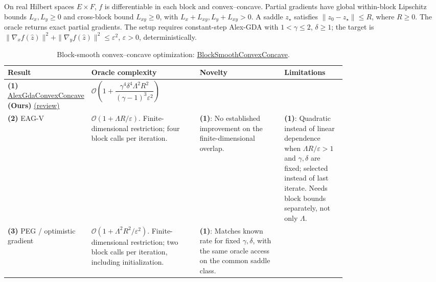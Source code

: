 \begin{table}[tp]
\centering
\caption{Block-smooth convex--concave optimization: \href{https://github.com/k3nfalt/longtails/blob/main/LongTails/Setups/BlockSmoothConvexConcave.lean}{BlockSmoothConvexConcave}.}\label{tab:BlockSmoothConvexConcave}
\parbox{\linewidth}{\footnotesize On real Hilbert spaces $E\times F$, $f$ is differentiable in each block and convex--concave. Partial gradients have global within-block Lipschitz bounds $L_x,L_y\ge0$ and cross-block bound $L_{xy}\ge0$, with $L_x+L_{xy},L_y+L_{xy}>0$. A saddle $z_\star$ satisfies $\|z_0-z_\star\|\le R$, where $R\ge0$. The oracle returns exact partial gradients. The setup requires constant-step Alex-GDA with $1<\gamma\le2$, $\delta\ge1$; the target is $\|\nabla_x f(\hat z)\|^2+\|\nabla_y f(\hat z)\|^2\le\varepsilon^2$, $\varepsilon>0$, deterministically.}\par\smallskip
\begin{threeparttable}
\footnotesize
\setlength{\tabcolsep}{4pt}\renewcommand{\arraystretch}{1.25}
\begin{tabularx}{\linewidth}{@{}>{\raggedright\arraybackslash}p{0.20\linewidth}>{\raggedright\arraybackslash}p{0.32\linewidth}>{\raggedright\arraybackslash}p{0.25\linewidth}>{\raggedright\arraybackslash}X@{}}
\toprule
\textbf{Result} & \textbf{Oracle complexity} & \textbf{Novelty} & \textbf{Limitations} \\
\midrule
\textbf{(1)} \href{https://github.com/k3nfalt/longtails/blob/main/LongTails/Theorems/AlexGdaConvexConcave.lean}{Alex\allowbreak Gda\allowbreak Convex\allowbreak Concave} \textbf{(Ours)} \href{https://github.com/k3nfalt/longtails/blob/main/scripts/reviews/AlexGdaConvexConcave.md}{(review)}
& $\mathcal{O}\!\left(1+\dfrac{\gamma^4\delta^4\Lambda^2R^2}{(\gamma-1)^3\varepsilon^2}\right)$ & & \\
\midrule[1.2pt]
\textbf{(2)} EAG-V \citep[Cor.~2]{bscYoonRyu2021}
& $\mathcal{O}(1+\Lambda R/\varepsilon)$.
Finite-dimensional restriction; four block calls per iteration.
& \textbf{(1)}: No established improvement on the finite-dimensional overlap.
& \textbf{(1)}: Quadratic instead of linear dependence when $\Lambda R/\varepsilon>1$ and $\gamma,\delta$ are fixed; selected instead of last iterate. Needs block bounds separately, not only $\Lambda$. \\
\midrule
\textbf{(3)} PEG / optimistic gradient \citep[Thm.~1]{bscGorbunov2022}
& $\mathcal{O}(1+\Lambda^2R^2/\varepsilon^2)$.
Finite-dimensional restriction; two block calls per iteration, including initialization.
& \textbf{(1)}: Matches known rate for fixed $\gamma,\delta$, with the same oracle access on the common saddle class.

\end{tabularx}
\end{threeparttable}
\end{table}
